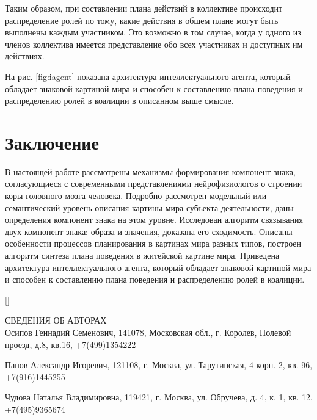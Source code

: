 \documentclass[a4paper, 12pt]{article}
\theoremstyle{plain}
\begin{document}
	Таким образом, при составлении плана действий в коллективе происходит распределение ролей по тому, какие действия в общем плане могут быть выполнены каждым участником. Это возможно в том случае, когда у одного из членов коллектива имеется представление обо всех участниках и доступных им действиях.
	
	На рис. \ref{fig:iagent} показана архитектура интеллектуального агента, который обладает знаковой картиной мира и способен к составлению плана поведения и распределению ролей в коалиции в описанном выше смысле.

	\section*{Заключение} В настоящей работе рассмотрены механизмы формирования компонент знака, согласующиеся с современными представлениями нейрофизиологов о строении коры головного мозга человека. Подробно рассмотрен модельный или семантический уровень описания картины мира субъекта деятельности, даны определения компонент знака на этом уровне. Исследован алгоритм связывания двух компонент знака: образа и значения, доказана его сходимость. Описаны особенности процессов планирования в картинах мира разных типов, построен алгоритм синтеза плана поведения в житейской картине мира. Приведена архитектура интеллектуального агента, который обладает знаковой картиной мира и способен к составлению плана поведения и распределению ролей в коалиции.
	
	\newpage
	

	\newpage
	\renewcommand{\listfigurename}{Подписи к рисункам статьи Осипова Г.С. и др.}
	\listoffigures		
	
	\newpage
	{\Large{\MakeUppercase{Сведения об авторах}}}\\

	Осипов Геннадий Семенович, 141078, Московская обл., г. Королев, Полевой проезд, д.8, кв.16, +7(499)1354222
	
	Панов Александр Игоревич, 121108, г. Москва, ул. Тарутинская, 4 корп. 2, кв. 96, \newline +7(916)1445255
	
	Чудова Наталья Владимировна, 119421, г. Москва, ул. Обручева, д. 4, к. 1, кв. 12, \newline +7(495)9365674
	
\end{document}
